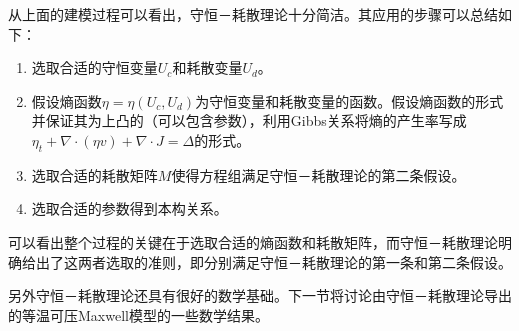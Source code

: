 
从上面的建模过程可以看出，守恒－耗散理论十分简洁。其应用的步骤可以总结如下：
\begin{enumerate}
	\item 选取合适的守恒变量$U_c$和耗散变量$U_d$。
	\item 假设熵函数$\eta = \eta(U_c,U_d)$为守恒变量和耗散变量的函数。假设熵函数的形式并保证其为上凸的（可以包含参数），利用Gibbs关系将熵的产生率写成$\eta_t+ \nabla \cdot (\eta v) + \nabla \cdot J = \Delta$的形式。
	\item 选取合适的耗散矩阵$M$使得方程组满足守恒－耗散理论的第二条假设。
	\item 选取合适的参数得到本构关系。
\end{enumerate}
可以看出整个过程的关键在于选取合适的熵函数和耗散矩阵，而守恒－耗散理论明确给出了这两者选取的准则，即分别满足守恒－耗散理论的第一条和第二条假设。


另外守恒－耗散理论还具有很好的数学基础。下一节将讨论由守恒－耗散理论导出的等温可压Maxwell模型的一些数学结果。

